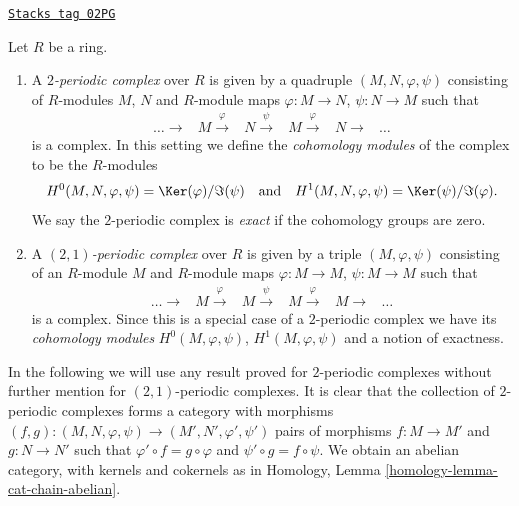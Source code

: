 \begin{definition}
\label{chow-definition-periodic-complex}
\href{https://stacks.math.columbia.edu/tag/02PG}{\texttt{Stacks tag 02PG}}

Let $R$ be a ring.
\begin{enumerate}
\item A {\it $2$-periodic complex} over $R$ is given
by a quadruple $(M, N, \varphi, \psi)$ consisting of
$R$-modules $M$, $N$ and $R$-module maps $\varphi : M \to N$,
$\psi : N \to M$ such that
$$
\begin{array}{cccccc}\ldots \longrightarrow & M \overset{\varphi}{\longrightarrow} & N \overset{\psi}{\longrightarrow} & M \overset{\varphi}{\longrightarrow} & N \longrightarrow & \ldots\end{array}
$$
is a complex. In this setting we define the {\it cohomology modules}
of the complex to be the $R$-modules
$$
H^0(M, N, \varphi, \psi) = \Ker(\varphi)/\Im(\psi)
\quad\text{and}\quad
H^1(M, N, \varphi, \psi) = \Ker(\psi)/\Im(\varphi).
$$
We say the $2$-periodic complex is {\it exact} if the cohomology
groups are zero.
\item A {\it $(2, 1)$-periodic complex} over $R$ is given
by a triple $(M, \varphi, \psi)$ consisting of an $R$-module $M$ and
$R$-module maps $\varphi : M \to M$, $\psi : M \to M$
such that
$$
\begin{array}{cccccc}\ldots \longrightarrow & M \overset{\varphi}{\longrightarrow} & M \overset{\psi}{\longrightarrow} & M \overset{\varphi}{\longrightarrow} & M \longrightarrow & \ldots\end{array}
$$
is a complex. Since this is a special case of a $2$-periodic complex
we have its {\it cohomology modules} $H^0(M, \varphi, \psi)$,
$H^1(M, \varphi, \psi)$ and a notion of exactness.
\end{enumerate}
\end{definition}

In the following we will use any result proved for $2$-periodic
complexes without further mention for $(2, 1)$-periodic complexes.
It is clear that the collection of $2$-periodic complexes forms a
category with morphisms
$(f, g) : (M, N, \varphi, \psi) \to (M', N', \varphi', \psi')$
pairs of morphisms $f : M \to M'$ and $g : N \to N'$ such
that $\varphi' \circ f = g \circ \varphi$ and $\psi' \circ g = f \circ \psi$.
We obtain an abelian category, with kernels and cokernels as in
Homology, Lemma \ref{homology-lemma-cat-chain-abelian}.

